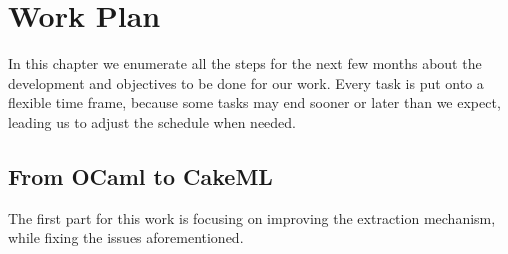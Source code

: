 
%

\chapter{Work Plan}
\label{cha:Work_Plan}

In this chapter we enumerate all the steps for the next few months about the development and objectives to be done for our work.
Every task is put onto a flexible time frame, because some tasks may end sooner or later than we expect, leading us to adjust the 
schedule when needed.

\section{From OCaml to CakeML}

The first part for this work is focusing on improving the extraction mechanism, while fixing the issues aforementioned.

